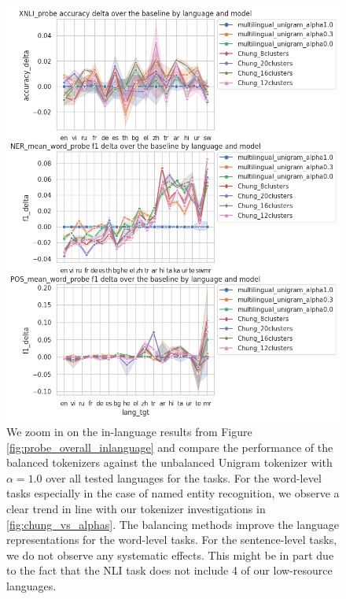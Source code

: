 \begin{figure}[H]
    \centering
    \includegraphics[width=\textwidth]{img/temp/probe_overall_inlanguage_over_baseline.png}
    \caption{We zoom in on the in-language results from Figure \ref{fig:probe_overall_inlanguage} and compare the performance of the balanced tokenizers against the unbalanced Unigram tokenizer with $\alpha=1.0$ over all tested languages for the tasks. For the word-level tasks especially in the case of named entity recognition, we observe a clear trend in line with our tokenizer investigations in \ref{fig:chung_vs_alphas}. The balancing methods improve the language representations for the word-level tasks. For the sentence-level tasks, we do not observe any systematic effects. This might be in part due to the fact that the NLI task does not include 4 of our low-resource languages.}
    \label{fig:probe_overall_inlanguage_over_baseline}
\end{figure}


